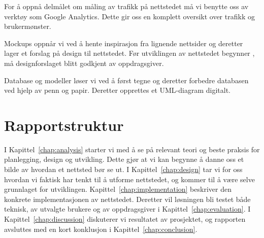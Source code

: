 For å oppnå delmålet om måling av trafikk på nettstedet må vi benytte oss av verktøy som Google Analytics. Dette gir oss en komplett oversikt over trafikk og brukermønster.

Mockups oppnår vi ved å hente inspirasjon fra lignende nettsider og deretter lager et forslag på design til nettstedet. Før utviklingen av nettstedet begynner , må designforslaget blitt godkjent av oppdragsgiver.

Database og modeller løser vi ved å først tegne og deretter forbedre databasen ved hjelp av penn og papir. Deretter opprettes et UML-diagram digitalt.

\section{Rapportstruktur}



I Kapittel~\ref{chap:analysis} starter vi med å se på relevant teori og beste praksis for planlegging, design og utvikling. Dette gjør at vi kan begynne å danne oss et bilde av hvordan et nettsted bør se ut. I Kapittel~\ref{chap:design} tar vi for oss hvordan vi faktisk har tenkt til å utforme nettstedet, og kommer til å være selve grunnlaget for utviklingen. Kapittel~\ref{chap:implementation} beskriver den konkrete implementasjonen av nettstedet. Deretter vil løsningen bli testet både teknisk, av utvalgte brukere og av oppdragsgiver i Kapittel~\ref{chap:evaluation}. I Kapittel~\ref{chap:discussion} diskuterer vi resultatet av prosjektet, og rapporten avsluttes med en kort konklusjon i Kapittel~\ref{chap:conclusion}.
